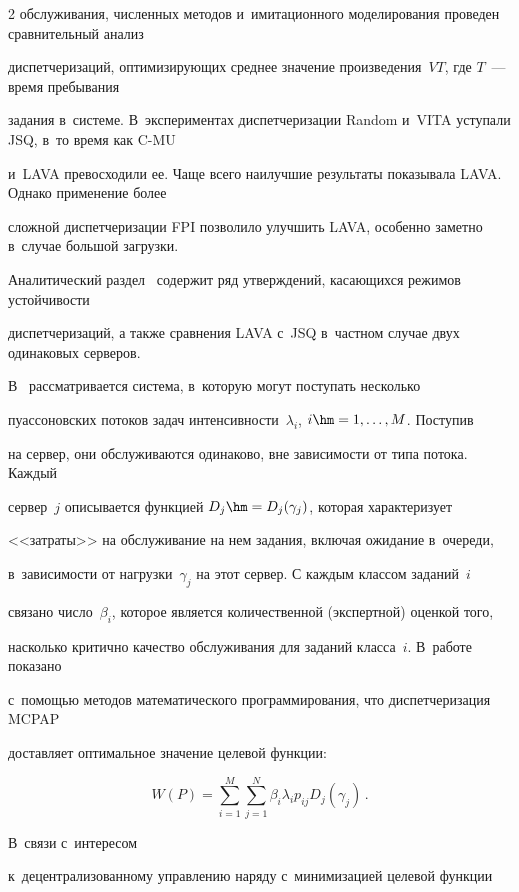 \begin{multicols}{2}
обслуживания, численных методов и~имитационного моделирования проведен сравнительный анализ 


диспетчеризаций, оптимизирующих среднее значение произведения~$VT$, где $T$~--- время пребывания 


задания в~системе. В~экспериментах диспетчеризации Random и~VITA уступали JSQ, в~то время как C-MU 


и~LAVA превосходили ее. Чаще всего наилучшие результаты показывала LAVA. Однако применение более 


сложной диспетчеризации FPI позволило улучшить LAVA, особенно заметно в~случае большой загрузки. 


Аналитический раздел~\cite{31-kon} содержит ряд утверждений, касающихся режимов устойчивости 


диспетчеризаций, а также сравнения LAVA с~JSQ в~частном случае двух одинаковых серверов.


    


    В~\cite{32-kon} рассматривается система, в~которую могут поступать несколько 


пуассоновских потоков задач интенсивности~$\lambda_i$, $i\hm= 1,\ldots, M$. Поступив 


на сервер, они обслуживаются одинаково, вне за\-ви\-си\-мости от типа потока. Каждый 


сервер~$j$ описывается функцией $D_j\hm= D_j(\gamma_j)$, которая характеризует 


<<затраты>> на обслуживание на нем задания, включая ожидание в~очереди, 


в~зависимости от нагрузки~$\gamma_j$ на этот сервер. С каждым классом заданий~$i$ 


связано число~$\beta_i$, которое является количественной (экспертной) оценкой того, 


насколько критично качество обслуживания для заданий класса~$i$. В~работе показано 


с~помощью методов математического программирования, что диспетчеризация MCPAP 


доставляет оптимальное значение целевой функции: 


$$


W(P)  = \sum\limits_{i=1}^M 


\sum\limits_{j=1}^N \beta_i \lambda_i p_{ij} D_j(\gamma_j)\,.


$$


 В~связи с~интересом 


к~децентрализованному управ\-ле\-нию наряду с~минимизацией целевой функции 



\end{multicols}
